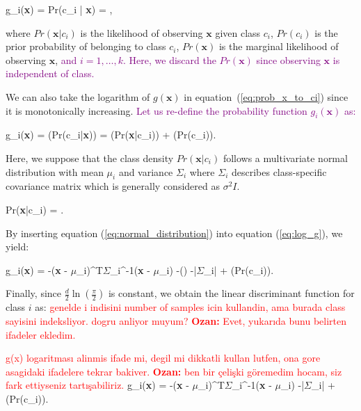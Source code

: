 \be
    \label{eq:prob_x_to_ci}
    g_{i}(\textbf{x}) = Pr(c_{i} | \textbf{x}) = , 
\ee

where $Pr(\textbf{x}|c_{i})$ is the likelihood of observing $\textbf{x}$ given class $c_{i}$, $Pr(c_{i})$ is the prior probability of belonging to class $c_{i}$, $Pr(\textbf{x})$ is the marginal likelihood of observing $\textbf{x}$, \textcolor{purple}{and $i = 1, \dots, k$. Here, we discard the $Pr(\textbf{x})$ since observing $\textbf{x}$ is independent of class.}

We can also take the logarithm of $g(\textbf{x})$ in equation~(\ref{eq:prob_x_to_ci}) since it is monotonically increasing. \textcolor{purple}{Let us re-define the probability function $g_{i}(\textbf{x})$ as:}

\be
\label{eq:log_g}
g_{i}(\textbf{x}) = \ln(Pr(c_{i}|\textbf{x})) = \ln(Pr(\textbf{x}|c_{i})) + \ln(Pr(c_{i}))\:.
\ee

Here, we suppose that the class density $Pr(\textbf{x}|c_{i})$ follows a multivariate normal distribution with mean $\textbf{$\mu$}_{i}$ and variance $\textbf{$\Sigma$}_{i}$ where $\textbf{$\Sigma$}_{i}$ describes class-specific covariance matrix which is generally considered as $\sigma^{2}I$.

\be
\label{eq:normal_distribution}
Pr(\textbf{x}|c_{i}) =  \exp {}.
\ee

By inserting equation (\ref{eq:normal_distribution}) into equation (\ref{eq:log_g}), we yield:

\be
\label{eq:prior_linear_disc_func}
g_{i}(\textbf{x}) = -(\textbf{x} - \textbf{$\mu$}_{i})^{T}{\textbf{$\Sigma$}_{i}}^{-1}(\textbf{x} - \textbf{$\mu$}_{i}) -\ln() -\ln|\textbf{$\Sigma$}_{i}| + \ln(Pr(c_{i}))\:.
\ee

Finally, since $\frac{d}{2}\ln(\frac{\pi}{2})$ is constant, we obtain the linear discriminant function for class $i$ as:  \textcolor{red}{genelde i indisini number of samples icin kullandin, ama burada class sayisini indeksliyor. dogru anliyor muyum? \textbf{Ozan:} Evet, yukarıda bunu belirten ifadeler ekledim.}

\textcolor{red}{g(x) logaritması alinmis ifade mi, degil mi dikkatli kullan lutfen, ona gore asagidaki ifadelere tekrar bakiver. \textbf{Ozan:} ben bir çelişki göremedim hocam, siz fark ettiyseniz tartışabiliriz.}
\be
\label{eq:linear_disc_func}
g_{i}(\textbf{x}) = -(\textbf{x} - \textbf{$\mu$}_{i})^{T}{\textbf{$\Sigma$}_{i}}^{-1}(\textbf{x} - \textbf{$\mu$}_{i}) -\ln|\textbf{$\Sigma$}_{i}| + \ln(Pr(c_{i}))\:.
\ee

